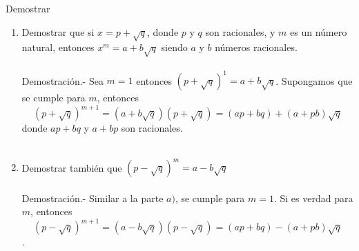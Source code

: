 \begin{teo} Demostrar
\begin{enumerate}[\bfseries a)]
\item Demostrar que si $x=p+ \sqrt{q}$, donde $p$ \; y \; $q$ son racionales, y \; $m$ es un número natural, entonces $x^m = a + b \sqrt{q}$ siendo $a$ \; y \; $b$ números racionales.\\\\
Demostración.- \; Sea $m=1$ entonces $(p + \sqrt{q})^1 = a + b\sqrt{q}$. Supongamos que se cumple para $m$, entonces $$(p+\sqrt{q})^{m+1} = (a + b\sqrt{q})(p + \sqrt{q}) = (ap+bq)+(a+pb)\sqrt{q}$$ donde $ap+bq$ y $a+bp$ son racionales.\\\\

\item Demostrar también que $(p- \sqrt{q})^m = a - b\sqrt{q}$\\\\
Demostración.- \; Similar a la parte $a)$, se cumple para $m=1$. Si es verdad para $m$, entonces $$(p-\sqrt{q})^{m+1} = (a - b\sqrt{q})(p - \sqrt{q}) = (ap+bq)-(a+pb)\sqrt{q}$$.\\\\
\end{enumerate}
\end{teo}